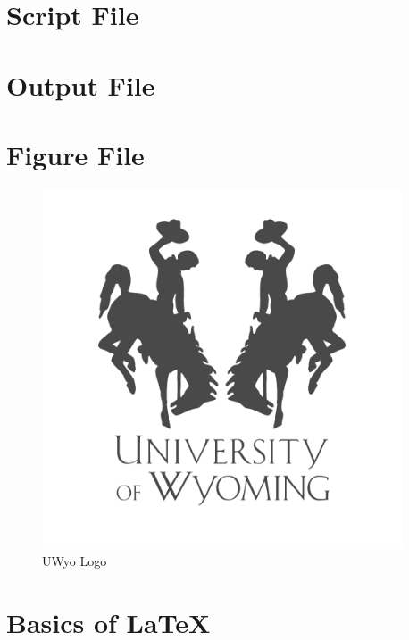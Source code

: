 \section{Script File}

\newpage
\section{Output File}

\newpage
\section{Figure File}
\begin{figure}[!hbtp]
    \centering
    \includegraphics[width=0.95\textwidth]{../src/UW_gray_new.png}
    \caption{UWyo Logo}
    \label{fig:my_label}
\end{figure}
\newpage

\section{Basics of \LaTeX{}}
\label{sec:bol}


